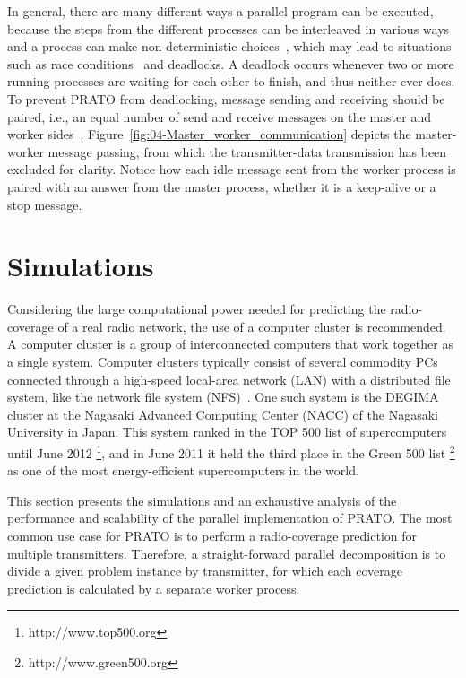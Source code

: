 In general, there are many different ways a parallel program can be
executed, because the steps from the different processes can be interleaved
in various ways and a process can make non-deterministic choices~\cite{Siegel_Verification_of_halting_properties_for_MPI_programs:2007},
which may lead to situations such as race conditions~\cite{Clemencon_MPI_Race_detection:1995}
and deadlocks. A deadlock occurs whenever two or more running processes
are waiting for each other to finish, and thus neither ever does.
To prevent PRATO from deadlocking, message sending and receiving should
be paired, i.e., an equal number of send and receive messages on the
master and worker sides~\cite{Siegel_Verification_of_halting_properties_for_MPI_programs:2007}.
Figure~\ref{fig:04-Master_worker_communication} depicts the master-worker
message passing, from which the transmitter-data transmission has
been excluded for clarity. Notice how each idle message sent from
the worker process is paired with an answer from the master process,
whether it is a keep-alive or a stop message.


\section{Simulations \label{sec:04-Simulations}}

Considering the large computational power needed for predicting the
radio-coverage of a real radio network, the use of a computer cluster
is recommended. A computer cluster is a group of interconnected computers
that work together as a single system. Computer clusters typically
consist of several commodity PCs connected through a high-speed local-area
network (LAN) with a distributed
file system, like the network file system (NFS)~\cite{Shepler_Network_file_system:2003}.
One such system is the DEGIMA cluster \cite{Hamada_Cluster_of_GPUs:2010}
at the Nagasaki Advanced Computing Center (NACC)
of the Nagasaki University in Japan. This system ranked in the TOP
500 list of supercomputers until June 2012%
\footnote{http://www.top500.org%
}, and in June 2011 it held the third place in the Green 500 list%
\footnote{http://www.green500.org%
} as one of the most energy-efficient supercomputers in the world.

This section presents the simulations and an exhaustive analysis of
the performance and scalability of the parallel implementation of
PRATO. The most common use case for PRATO is to perform a radio-coverage
prediction for multiple transmitters. Therefore, a straight-forward
parallel decomposition is to divide a given problem instance by transmitter,
for which each coverage prediction is calculated by a separate worker
process.

